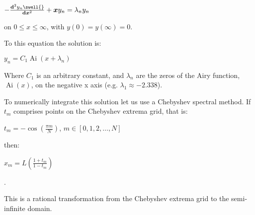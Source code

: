 \documentclass{article}
\newcommand{\tmmathbf}[1]{\ensuremath{\boldsymbol{#1}}}
\newcommand{\tmop}[1]{\ensuremath{\operatorname{#1}}}
\newcommand{\tmtextmd}[1]{{\mdseries{#1}}}
\begin{document}
$- \frac{\mathrm{\ensuremath{\mathbf{d}}}^2 y_n \swell{}}{\mathit{\mathbf{d}}
\text{\tmtextmd{\ensuremath{\tmmathbf{x}}}}^2} +\tmmathbf{x}y_n = \lambda_n
y_n$

on $0 \leqslant x \leqslant \infty$, with $y (0) = y (\infty) = 0$.

To this equation the solution is:

$y_n = C_1 \tmop{Ai} (x + \lambda_n)$

Where $C_1$ is an arbitrary constant, and $\lambda_n$ are the zeros of the
Airy function, $\tmop{Ai} (x)$, on the negative x axis (e.g. $\lambda_1
\approx - 2.338$).

To numerically integrate this solution let us use a Chebyshev spectral
method. If $t_m$ comprises points on the Chebyshev extrema grid, that is:

$t_m = - \cos \left( \frac{\pi m}{N} \right)$, \qquad$m \in [0, 1, 2, \ldots,
N]$

then:

$x_m = L \left( \frac{1 + t_m}{1 - t_m} \right)$

.

This is a rational transformation from the Chebyshev extrema grid to the
semi-infinite domain.
\end{document}
